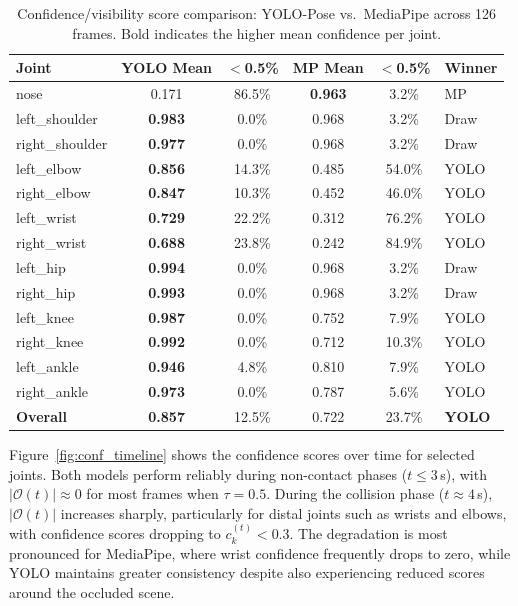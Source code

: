 \documentclass{article}
\begin{document}
\begin{table}[htbp]
  \centering
  \caption{Confidence/visibility score comparison: YOLO-Pose vs.\
           MediaPipe across 126 frames. Bold indicates the higher mean
           confidence per joint.}
  \label{tab:conf_comparison}
  \footnotesize
  \begin{tabular}{@{}l cc cc l@{}}
    \toprule
    Joint
      & YOLO Mean & $<$0.5\%
      & MP Mean   & $<$0.5\%
      & Winner \\
    \midrule
    nose            & 0.171 & 86.5\% & \textbf{0.963} &  3.2\% & MP   \\
    left\_shoulder  & \textbf{0.983} &  0.0\% & 0.968 &  3.2\% & Draw \\
    right\_shoulder & \textbf{0.977} &  0.0\% & 0.968 &  3.2\% & Draw \\
    left\_elbow     & \textbf{0.856} & 14.3\% & 0.485 & 54.0\% & YOLO \\
    right\_elbow    & \textbf{0.847} & 10.3\% & 0.452 & 46.0\% & YOLO \\
    left\_wrist     & \textbf{0.729} & 22.2\% & 0.312 & 76.2\% & YOLO \\
    right\_wrist    & \textbf{0.688} & 23.8\% & 0.242 & 84.9\% & YOLO \\
    left\_hip       & \textbf{0.994} &  0.0\% & 0.968 &  3.2\% & Draw \\
    right\_hip      & \textbf{0.993} &  0.0\% & 0.968 &  3.2\% & Draw \\
    left\_knee      & \textbf{0.987} &  0.0\% & 0.752 &  7.9\% & YOLO \\
    right\_knee     & \textbf{0.992} &  0.0\% & 0.712 & 10.3\% & YOLO \\
    left\_ankle     & \textbf{0.946} &  4.8\% & 0.810 &  7.9\% & YOLO \\
    right\_ankle    & \textbf{0.973} &  0.0\% & 0.787 &  5.6\% & YOLO \\
    \midrule
    \textbf{Overall}& \textbf{0.857} & 12.5\% & 0.722 & 23.7\% & \textbf{YOLO} \\
    \bottomrule
  \end{tabular}
\end{table}

Figure~\ref{fig:conf_timeline} shows the confidence scores over time for
selected joints.
Both models perform reliably during non-contact phases
($t \leq 3$\,s), with $|\mathcal{O}(t)| \approx 0$ for most frames
when $\tau = 0.5$.
During the collision phase ($t \approx 4$\,s), $|\mathcal{O}(t)|$
increases sharply, particularly for distal joints such as wrists and
elbows, with confidence scores dropping to $c_k^{(t)} < 0.3$.
The degradation is most pronounced for MediaPipe, where wrist confidence
frequently drops to zero, while YOLO maintains greater consistency
despite also experiencing reduced scores around the occluded scene.
\end{document}
